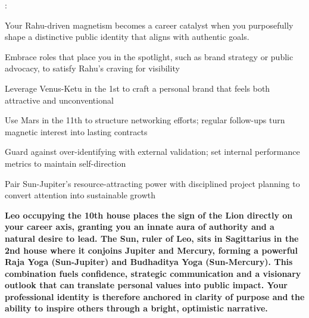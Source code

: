 {\fontsize{9}{13}\selectfont :}\par\vspace{1.8mm}

{\fontsize{9}{13}\selectfont Your Rahu-driven magnetism becomes a career catalyst when you purposefully shape a distinctive public identity that aligns with authentic goals.}\par\vspace{1.8mm}

\begin{diamondlist}
  \item {\fontsize{8.5}{12}\selectfont Embrace roles that place you in the spotlight, such as brand strategy or public advocacy, to satisfy Rahu's craving for visibility}
  \item {\fontsize{8.5}{12}\selectfont Leverage Venus-Ketu in the 1st to craft a personal brand that feels both attractive and unconventional}
  \item {\fontsize{8.5}{12}\selectfont Use Mars in the 11th to structure networking efforts; regular follow-ups turn magnetic interest into lasting contracts}
  \item {\fontsize{8.5}{12}\selectfont Guard against over-identifying with external validation; set internal performance metrics to maintain self-direction}
  \item {\fontsize{8.5}{12}\selectfont Pair Sun-Jupiter's resource-attracting power with disciplined project planning to convert attention into sustainable growth}
\end{diamondlist}


\label{topic11}

{\fontsize{9.5}{13.8}\selectfont\bfseries\color{DeepSlate} Leo occupying the 10th house places the sign of the Lion directly on your career axis, granting you an innate aura of authority and a natural desire to lead. The Sun, ruler of Leo, sits in Sagittarius in the 2nd house where it conjoins Jupiter and Mercury, forming a powerful Raja Yoga (Sun-Jupiter) and Budhaditya Yoga (Sun-Mercury). This combination fuels confidence, strategic communication and a visionary outlook that can translate personal values into public impact. Your professional identity is therefore anchored in clarity of purpose and the ability to inspire others through a bright, optimistic narrative.}\par\vspace{2mm}

